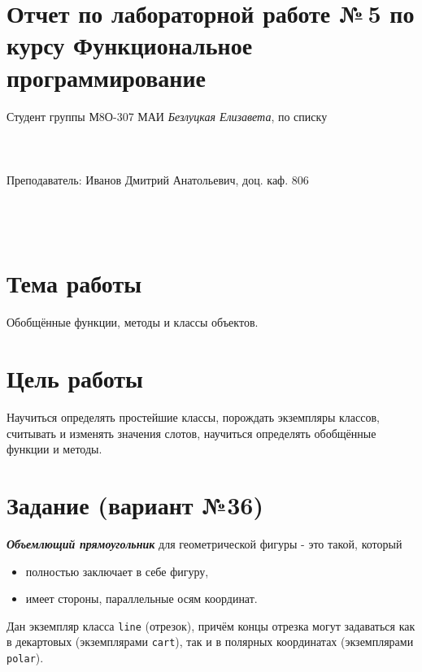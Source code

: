 \documentclass[12pt]{article}
\begin{document}
\section*{Отчет по лабораторной работе №\,5	 
по курсу \guillemotleft  Функциональное программирование\guillemotright}
\begin{flushright}
Студент группы М8О-307 МАИ \textit{Безлуцкая Елизавета},  по списку \\
 \\
 \\
\ \\
Преподаватель: Иванов Дмитрий Анатольевич, доц. каф. 806 \\
 \\
 \\
 \\

\end{flushright}

\section{Тема работы}
Обобщённые функции, методы и классы объектов.

\section{Цель работы}
Научиться определять простейшие классы, порождать экземпляры классов, считывать и изменять значения слотов, научиться определять обобщённые функции и методы.

\section{Задание (вариант №36)}
\textbf{\textit{Объемлющий прямоугольник}} для геометрической фигуры - это такой, который

\begin{itemize}
\item полностью заключает в себе фигуру,
\item имеет стороны, параллельные осям координат.
\end{itemize}

Дан экземпляр класса {\tt line} (отрезок), причём концы отрезка могут задаваться как в декартовых (экземплярами {\tt cart}), так и в полярных координатах (экземплярами  {\tt polar}).
\end{document}

